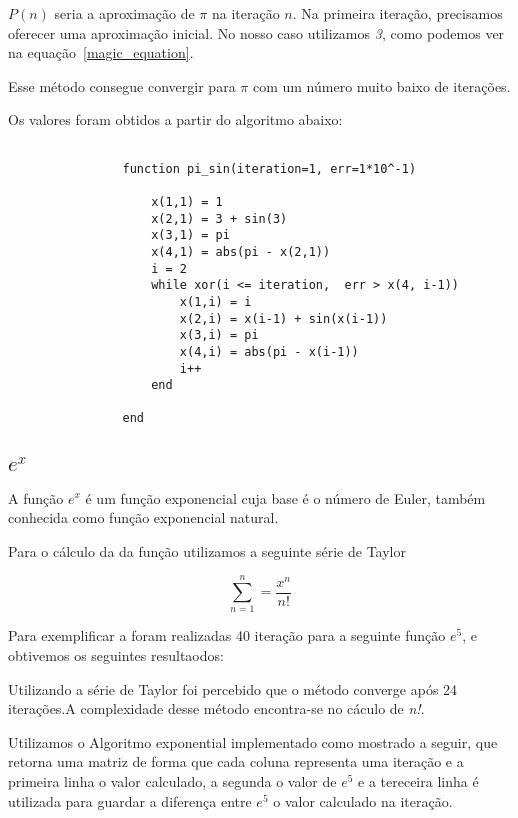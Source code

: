 			$P(n)$ seria a aproximação de $\pi$ na iteração $n$. Na primeira
			iteração, precisamos oferecer uma aproximação inicial. No nosso caso
			utilizamos \emph{3}, como podemos ver na
			equação~\ref{magic_equation}.
			
			Esse método consegue convergir para $\pi$ com um número muito baixo
			de iterações.

			

			Os valores foram obtidos a partir do algoritmo abaixo:

			\begin{lstlisting}

				function pi_sin(iteration=1, err=1*10^-1)
					
					x(1,1) = 1
					x(2,1) = 3 + sin(3)
					x(3,1) = pi
					x(4,1) = abs(pi - x(2,1))
					i = 2
					while xor(i <= iteration,  err > x(4, i-1))
						x(1,i) = i
						x(2,i) = x(i-1) + sin(x(i-1))
						x(3,i) = pi
						x(4,i) = abs(pi - x(i-1))
						i++
					end

				end

			\end{lstlisting}

	\subsection{$e^x$}

		A função $e^x$ é um função exponencial cuja base é o número de Euler,
		também conhecida como função exponencial natural.

		Para o cálculo da da função utilizamos a seguinte série de Taylor

		\begin{equation}
			\sum_{n=1}^{n} = \frac{x^n}{n!}
		\end{equation}

		Para exemplificar a foram realizadas 40 iteração para a seguinte função
		$e^5$, e obtivemos os seguintes resultaodos:

		

		Utilizando a série de Taylor foi percebido que o método converge após 24
		iterações.A complexidade desse método encontra-se no cáculo de
		\emph{n!}.

		Utilizamos o Algoritmo exponential implementado como mostrado a seguir,
		que retorna uma matriz de forma que cada coluna representa uma iteração
		e a primeira linha o valor calculado, a segunda o valor de $e^5$ e a
		tereceira linha é utilizada para guardar a diferença entre $e^5$ o valor
		calculado na iteração.

